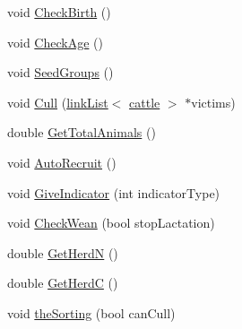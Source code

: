 \begin{DoxyCompactItemize}
\item 
void \hyperlink{classdairy_stock_ab6fa75b8d046e8de37589b02829fb50e}{CheckBirth} ()
\item 
void \hyperlink{classdairy_stock_a0de0c3cb5055c9eeeb9d30a039ec0774}{CheckAge} ()
\item 
void \hyperlink{classdairy_stock_a4642b99f0f7e88a41d99071a915d3f8f}{SeedGroups} ()
\item 
void \hyperlink{classdairy_stock_aa404f38c38a68b7cecd44b8fd96229ee}{Cull} (\hyperlink{classlink_list}{linkList}$<$ \hyperlink{classcattle}{cattle} $>$ $\ast$victims)
\item 
double \hyperlink{classdairy_stock_a8db1921052fd00477cf26d15a965cda3}{GetTotalAnimals} ()
\item 
void \hyperlink{classdairy_stock_a86008d68d20074f0261eec2e8e2ed9a0}{AutoRecruit} ()
\item 
void \hyperlink{classdairy_stock_a3d06c27cd2651c99b1fdf1273d0f6289}{GiveIndicator} (int indicatorType)
\item 
void \hyperlink{classdairy_stock_a19f2b3a2ee8d65b4b7419e327baa2eb0}{CheckWean} (bool stopLactation)
\item 
double \hyperlink{classdairy_stock_a1e7445e8dc3f08acecfd0d22c8e097f3}{GetHerdN} ()
\item 
double \hyperlink{classdairy_stock_aef1627aca995e99f7abecf477ef02be9}{GetHerdC} ()
\item 
void \hyperlink{classdairy_stock_a77965d4b6f503d4ef330214e814355ef}{theSorting} (bool canCull)
\end{DoxyCompactItemize}
